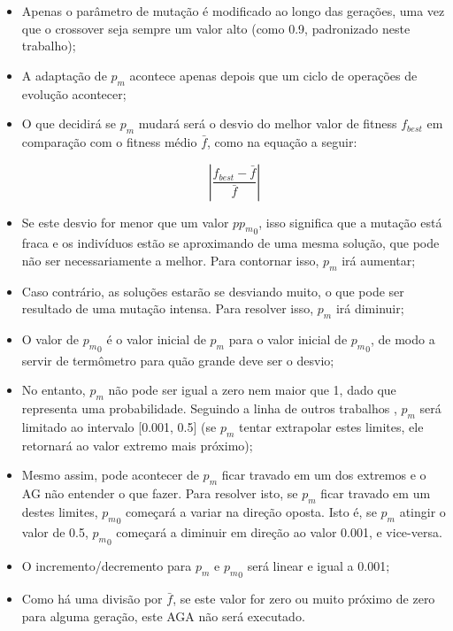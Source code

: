 \begin{itemize}

	\item Apenas o parâmetro de mutação é modificado ao longo das gerações, uma vez que o crossover seja sempre um valor alto (como 0.9, padronizado neste trabalho);

	\item A adaptação de $p_m$ acontece apenas depois que um ciclo de operações de evolução acontecer;

	\item O que decidirá se $p_m$ mudará será o desvio do melhor valor de fitness $f_{best}$ em comparação com o fitness médio $\bar{f}$, como na equação a seguir:

\begin{equation}
	\left| \frac{f_{best} - \bar{f}}{\bar{f}} \right|
\label{eq:aga}
\end{equation}

	\item Se este desvio for menor que um valor $p{p_m}_0$, isso significa que a mutação está fraca e os indivíduos estão se aproximando de uma mesma solução, que pode não ser necessariamente a melhor. Para contornar isso, $p_m$ irá aumentar;

	\item Caso contrário, as soluções estarão se desviando muito, o que pode ser resultado de uma mutação intensa. Para resolver isso, $p_m$ irá diminuir;

	\item O valor de ${p_m}_0$ é o valor inicial de $p_m$ para o valor inicial de ${p_m}_0$, de modo a servir de termômetro para quão grande deve ser o desvio;

	\item No entanto, $p_m$ não pode ser igual a zero nem maior que 1, dado que representa uma probabilidade. Seguindo a linha de outros trabalhos \cite{matthias2013variable}, $p_m$ será limitado ao intervalo [0.001, 0.5] (se $p_m$ tentar extrapolar estes limites, ele retornará ao valor extremo mais próximo);
	
	\item Mesmo assim, pode acontecer de $p_m$ ficar travado em um dos extremos e o AG não entender o que fazer. Para resolver isto, se $p_m$ ficar travado em um destes limites, ${p_m}_0$ começará a variar na direção oposta. Isto é, se $p_m$ atingir o valor de 0.5, ${p_m}_0$ começará a diminuir em direção ao valor 0.001, e vice-versa.

	\item O incremento/decremento para $p_m$ e ${p_m}_0$ será linear e igual a 0.001;
	
	\item Como há uma divisão por $\bar{f}$, se este valor for zero ou muito próximo de zero para alguma geração, este AGA não será executado.

\end{itemize}

